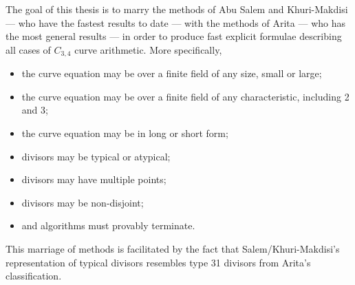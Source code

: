 The goal of this thesis is to marry the methods of Abu Salem and Khuri-Makdisi --- who have the fastest results to date ---
with the methods of Arita --- who has the most general results ---
in order to produce fast explicit formulae describing all cases of $C_{3,4}$ curve arithmetic.
More specifically,
\begin{itemize}
  \item the curve equation may be over a finite field of any size, small or large;
  \item the curve equation may be over a finite field of any characteristic, including 2 and 3;
  \item the curve equation may be in long or short form;
  \item divisors may be typical or atypical;
  \item divisors may have multiple points;
  \item divisors may be non-disjoint;
  \item and algorithms must provably terminate.
\end{itemize}
This marriage of methods is facilitated by the fact that Salem/Khuri-Makdisi's representation of typical divisors resembles type 31 divisors from Arita's classification.


